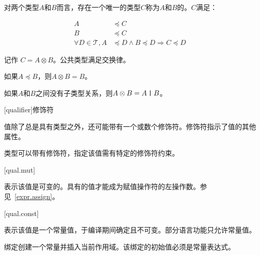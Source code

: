 \pnum
对两个类型$A$和$B$而言，存在一个唯一的类型$C$称为$A$和$B$的。$C$满足：

\begin{equation}
\begin{aligned}
    A &\preceq C \\
    B &\preceq C \\
    \forall D \in \mathcal{T}, A &\preceq D \land B \preceq D \Rightarrow C \preceq D
\end{aligned}
\end{equation}

记作 $C = A \otimes B$。公共类型满足交换律。

\pnum
如果$A \preceq B$，则$A \otimes B = B$。

\pnum
如果$A$和$B$之间没有子类型关系，则$A \otimes B = A \mathbin{\texttt{|}} B$。

[qualifier]{修饰符}

\pnum
值除了总是具有类型之外，还可能带有一个或数个修饰符。修饰符指示了值的其他属性。

\pnum
类型可以带有修饰符，指定该值需有特定的修饰符约束。

[qual.mut]{}

\pnum
{}表示该值是可变的。具有的值才能成为赋值操作符的左操作数。参见~\ref{expr.assign}。

[qual.const]{}

\pnum
{}表示该值是一个常量值，于编译期间确定且不可变。部分语言功能只允许常量值。

\pnum
{}绑定创建一个常量并插入当前作用域。该绑定的初始值必须是常量表达式。
